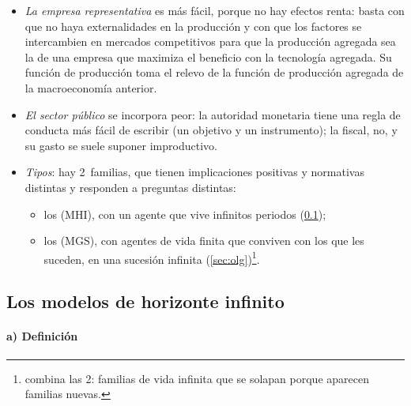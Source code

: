 \documentclass[11pt]{article}
\begin{document}
\begin{itemize}
\item \emph{La empresa representativa} es más fácil, porque no hay efectos renta: basta con que no haya externalidades en la producción y con que los factores se intercambien en mercados competitivos para que la producción agregada sea la de una empresa que maximiza el beneficio con la tecnología agregada\nocite{Acemoglu2009}. Su función de producción toma el relevo de la función de producción agregada de la macroeconomía anterior.
\item \emph{El sector público} se incorpora peor: la autoridad monetaria tiene una regla de conducta más fácil de escribir (un objetivo y un instrumento); la fiscal, no, y su gasto se suele suponer improductivo.
\item \emph{Tipos}: hay 2~familias, que tienen implicaciones positivas y normativas distintas y responden a preguntas distintas:
  \begin{itemize}
  \item los  (MHI), con un agente que vive infinitos periodos (\ref{sec:horizonte-infinito});
  \item los  (MGS), con agentes de vida finita que conviven con los que les suceden, en una sucesión infinita (\ref{sec:olg})\footnote{\textcite{Weil1989Overlapping} combina las 2: familias de vida infinita que se solapan porque aparecen familias nuevas.}.
  \end{itemize}
\end{itemize}

\subsection{Los modelos de horizonte infinito}\label{sec:horizonte-infinito}

\paragraph{a) Definición}
\end{document}
